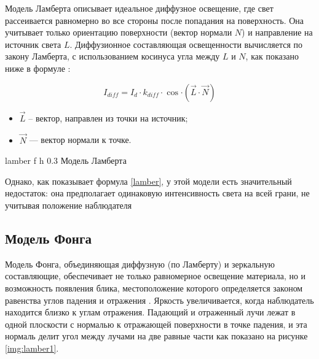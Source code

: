 Модель Ламберта описывает идеальное диффузное освещение, где свет рассеивается равномерно во все стороны после попадания на поверхность. \cite{lightmodf} Она учитывает только ориентацию поверхности (вектор нормали $N$) и направление на источник света $L$. Диффузионное составляющая освещенности вычисляется по закону Ламберта, с использованием косинуса угла между $L$ и $N$, как показано ниже в формуле \cite{lightmodfv}:


\begin{equation}\label{lamber}
	I_{diff}=I_{d} \cdot k_{diff} \cdot \cos{\cdot (\vec L \cdot \vec N)}
\end{equation}

\begin{itemize}
	\item $\vec L$ -- вектор, направлен из точки на источник;
	\item $\vec N$ --- вектор нормали к точке.
\end{itemize}



	{lamber} %
	{f} %
	{h} %
	{0.3\textwidth} %
	{Модель Ламберта} %

Однако, как показывает формула \ref{lamber}, у этой модели есть значительный недостаток: она предполагает одинаковую интенсивность света на всей грани, не учитывая положение наблюдателя


\subsection{Модель Фонга}

Модель Фонга, объединяющая диффузную (по Ламберту) и зеркальную составляющие, обеспечивает не только равномерное освещение материала, но и возможность появления блика, местоположение которого определяется законом равенства углов падения и отражения \cite{lightmodfv}. Яркость увеличивается, когда наблюдатель находится близко к углам отражения. Падающий и отраженный лучи лежат в одной плоскости с нормалью к отражающей поверхности в точке падения, и эта нормаль делит угол между лучами на две равные части как показано на рисунке \ref{img:lamber1}.

